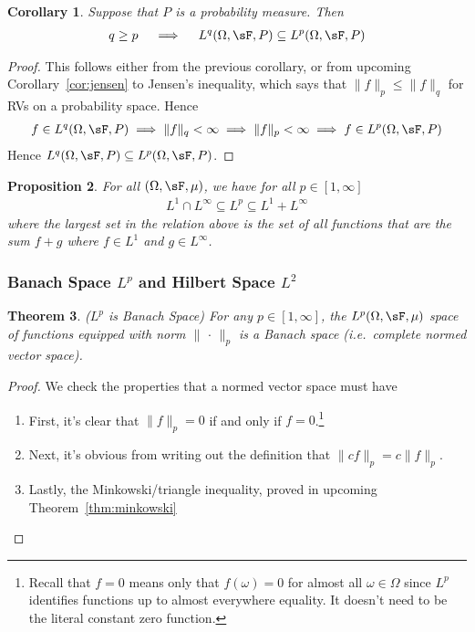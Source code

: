 \documentclass[12pt]{article}
\theoremstyle{plain}
\newtheorem{thm}{Theorem}[section]
\newtheorem{prop}[thm]{Proposition}
\newtheorem{cor}[thm]{Corollary}
\theoremstyle{definition}
\theoremstyle{remark}
\begin{document}
\begin{cor}
\label{cor:Lpinclusion}
Suppose that $P$ is a probability measure. Then
\begin{align*}
  q \geq p
  \quad\implies\quad
  L^q(\Omega,\sF,P)
  \subseteq
  L^p(\Omega,\sF,P)
\end{align*}
\end{cor}
\begin{proof}
This follows either from the previous corollary, or from upcoming
Corollary~\ref{cor:jensen} to Jensen's inequality, which says that
$\lVert f\rVert_p\leq \lVert f\rVert_q$
for RVs on a probability space.
Hence
\begin{align*}
  f\in L^q(\Omega,\sF,P)
  \implies
  \lVert f\rVert_q
  < \infty
  \implies
  \lVert f\rVert_p
  < \infty
  \implies
  f\in L^p(\Omega,\sF,P)
\end{align*}
Hence $L^q(\Omega,\sF,P)\subseteq L^p(\Omega,\sF,P)$.
\end{proof}

\begin{prop}
For all $(\Omega,\sF,\mu)$, we have for all $p\in[1,\infty]$
\begin{align*}
  L^1 \cap L^\infty \subseteq L^p \subseteq L^1+L^\infty
\end{align*}
where the largest set in the relation above is the set of all functions
that are the sum $f+g$ where $f\in L^1$ and $g\in L^\infty$.
\end{prop}


\clearpage
\subsubsection{Banach Space $L^p$ and Hilbert Space $L^2$}

\begin{thm}\emph{($L^p$ is Banach Space)}
For any $p\in[1,\infty]$, the $L^p(\Omega,\sF,\mu)$ space of functions
equipped with norm $\lVert\,\cdot\,\rVert_p$ is a Banach space (i.e.\
complete normed vector space).
\end{thm}
\begin{proof}
We check the properties that a normed vector space must have
\begin{enumerate}
  \item First, it's clear that $\lVert f\rVert_p=0$ if and only if
    $f=0$.\footnote{%
      Recall that $f=0$ means only that $f(\omega)=0$ for almost all
      $\omega\in\Omega$ since $L^p$ identifies functions up to almost
      everywhere equality. It doesn't need to be the literal constant
      zero function.
    }
  \item Next, it's obvious from writing out the definition that $\lVert
    cf\rVert_p = c\lVert f\rVert_p$.
  \item Lastly, the Minkowski/triangle inequality,
    proved in upcoming Theorem~\ref{thm:minkowski}
\end{enumerate}
\end{proof}
\end{document}
